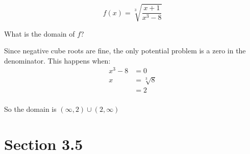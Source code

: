 \documentclass{exam}
\begin{document}
\begin{questions}
\begin{solution}

      \end{solution}

      \question 
        \[
          f(x) = \sqrt[3]{\frac{x + 1}{x^3 - 8}}
        \]

        What is the domain of $f$?

        \begin{solution}
          Since negative cube roots are fine, the only potential problem is a zero in the denominator.  This happens
          when:
          \begin{align*}
            x^3 - 8 &= 0 \\
            x &= \sqrt[3]{8} \\
            &= 2 \\
          \end{align*}

          So the domain is $\boxed{(\infty, 2) \cup (2, \infty)}$

        \end{solution}

  \end{questions}

  \ifprintanswers

    \section{Section 3.5}
\end{document}
